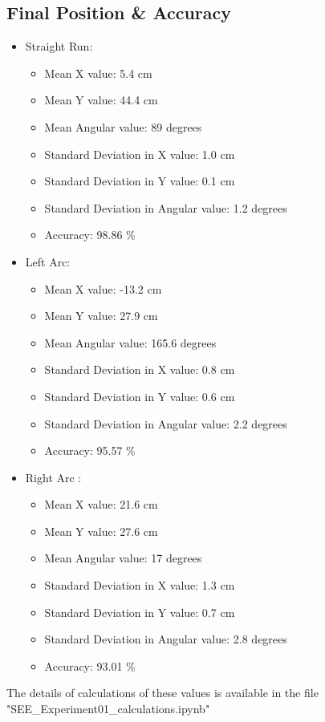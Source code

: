 \documentclass[10pt,a4paper]{article}
\begin{document}
			\subsection{Final Position \& Accuracy }
			\begin{itemize}
				\item Straight Run:		
					\begin{itemize}
						\item Mean X value: 5.4 cm
						\item Mean Y value: 44.4 cm
						\item Mean Angular value: 89 degrees
						\item Standard Deviation in X value: 1.0 cm
						\item Standard Deviation in Y value: 0.1 cm
						\item Standard Deviation in Angular value: 1.2 degrees
						\item Accuracy: 98.86 \%
					\end{itemize}
				\item Left Arc:
					\begin{itemize}
						\item Mean X value: -13.2 cm
						\item Mean Y value: 27.9 cm
						\item Mean Angular value: 165.6 degrees
						\item Standard Deviation in X value: 0.8 cm
						\item Standard Deviation in Y value: 0.6 cm
						\item Standard Deviation in Angular value: 2.2 degrees
						\item Accuracy: 95.57 \%
					\end{itemize}
				\item Right Arc	:
					\begin{itemize}
						\item Mean X value: 21.6 cm
						\item Mean Y value: 27.6 cm
						\item Mean Angular value: 17 degrees
						\item Standard Deviation in X value: 1.3 cm
						\item Standard Deviation in Y value: 0.7 cm
						\item Standard Deviation in Angular value: 2.8 degrees
						\item Accuracy: 93.01 \%
					\end{itemize}	
			\end{itemize}
			The details of calculations of these values is available in the file "SEE\_Experiment01\_calculations.ipynb"
\end{document}
